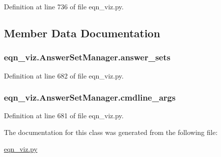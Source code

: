 Definition at line 736 of file eqn\+\_\+viz.\+py.



\subsection{Member Data Documentation}
\hypertarget{classeqn__viz_1_1_answer_set_manager_ab50545866708c615d07364479ab771e5}{}
\subsubsection[{answer\+\_\+sets}]{\setlength{\rightskip}{0pt plus 5cm}eqn\+\_\+viz.\+Answer\+Set\+Manager.\+answer\+\_\+sets}\label{classeqn__viz_1_1_answer_set_manager_ab50545866708c615d07364479ab771e5}


Definition at line 682 of file eqn\+\_\+viz.\+py.

\hypertarget{classeqn__viz_1_1_answer_set_manager_a15d9c03574ab43af95dc420cb125df11}{}
\subsubsection[{cmdline\+\_\+args}]{\setlength{\rightskip}{0pt plus 5cm}eqn\+\_\+viz.\+Answer\+Set\+Manager.\+cmdline\+\_\+args}\label{classeqn__viz_1_1_answer_set_manager_a15d9c03574ab43af95dc420cb125df11}


Definition at line 681 of file eqn\+\_\+viz.\+py.



The documentation for this class was generated from the following file\+:\begin{DoxyCompactItemize}
\item 
\hyperlink{eqn__viz_8py}{eqn\+\_\+viz.\+py}\end{DoxyCompactItemize}
